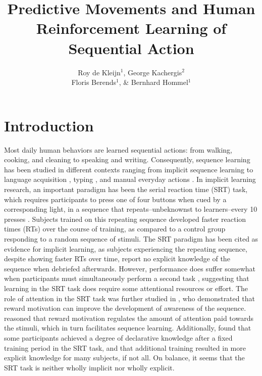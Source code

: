 \documentclass[man,floatsintext]{apa6}
\title{Predictive Movements and Human Reinforcement Learning of Sequential Action}
\author{
 Roy de Kleijn$^{1}$, George Kachergis$^{2}$ \\
 Floris Berends$^{1}$, \& Bernhard Hommel$^{1}$
}
\affiliation{
$^{1}$Cognitive Psychology Unit, Leiden University \\
  Leiden, the Netherlands \\
$^{2}$Department of Artificial Intelligence, Radboud University \\
  Nijmegen, the Netherlands
}
\begin{document}
\maketitle

\section{Introduction} 

Most daily human behaviors are learned sequential actions: from walking, cooking, and cleaning to speaking and writing. Consequently, sequence learning has been studied in different contexts ranging from implicit sequence learning \cite{Nissen:1987,Cleeremans:1991,Stadler:1992,Boyer:2005} to language acquisition \cite{Elman:1990,Saffran:1996}, typing \cite{Fendrick:1937,Gentner:1988}, and manual everyday actions \cite{Cooper:2000,Botvinick:2004}. In implicit learning research, an important paradigm has been the serial reaction time (SRT) task, which requires participants to press one of four buttons when cued by a corresponding light, in a sequence that repeats--unbeknownst to learners--every 10 presses \cite{Nissen:1987}. Subjects trained on this repeating sequence developed faster reaction times (RTs) over the course of training, as compared to a control group responding to a random sequence of stimuli. The SRT paradigm has been cited as evidence for implicit learning, as subjects experiencing the repeating sequence, despite showing faster RTs over time, report no explicit knowledge of the sequence when debriefed afterwards. However, performance does suffer somewhat when participants must simultaneously perform a second task \cite{Nissen:1987}, suggesting that learning in the SRT task does require some attentional resources or effort. The role of attention in the SRT task was further studied in , who demonstrated that reward motivation can improve the development of awareness of the sequence.  reasoned that reward motivation regulates the amount of attention paid towards the stimuli, which in turn facilitates sequence learning. Additionally,  found that some participants achieved a degree of declarative knowledge after a fixed training period in the SRT task, and that additional training resulted in more explicit knowledge for many subjects, if not all. On balance, it seems that the SRT task is neither wholly implicit nor wholly explicit.
\end{document}
